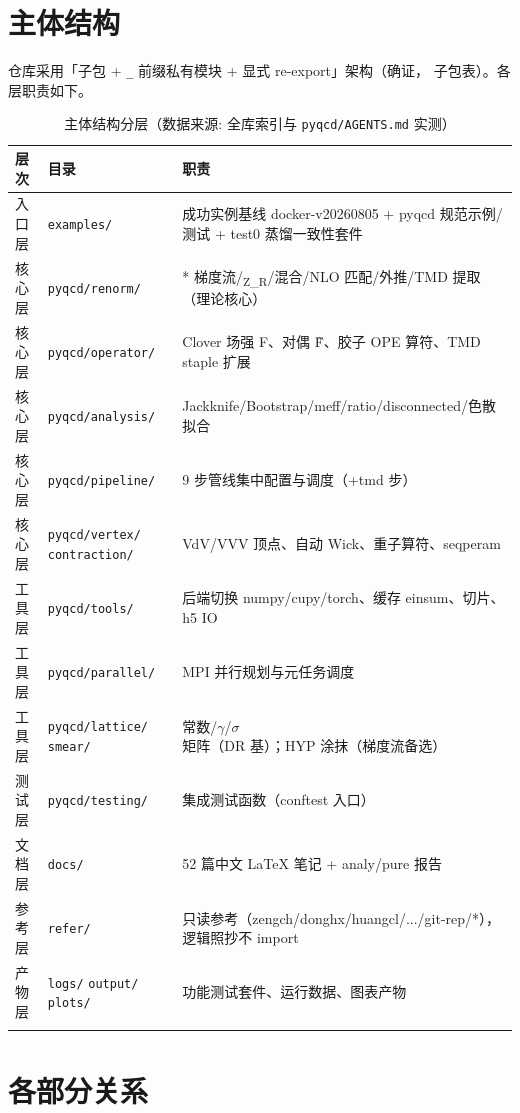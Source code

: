 \documentclass[UTF8]{ctexart}
\begin{document}
\section{主体结构}
仓库采用「子包 + \texttt{\_} 前缀私有模块 + 显式 re-export」架构（\textcolor{struct}{确证}，
\texttt{} 子包表）。各层职责如下。
\begin{xltabular}{\textwidth}{llX}
\toprule
\textcolor{struct}{层次} & 目录 & \textcolor{struct}{职责} \\
\midrule
\endhead
入口层 & \texttt{examples/} & 成功实例基线 docker-v20260805 + pyqcd 规范示例/测试 + test0 蒸馏一致性套件 \\
核心层 & \texttt{pyqcd/renorm/} & * 梯度流/\textsubscript{Z\_R}/混合/NLO 匹配/外推/TMD 提取（理论核心） \\
核心层 & \texttt{pyqcd/operator/} & Clover 场强 F、对偶 F̃、胶子 OPE 算符、TMD staple 扩展 \\
核心层 & \texttt{pyqcd/analysis/} & Jackknife/Bootstrap/meff/ratio/disconnected/色散拟合 \\
核心层 & \texttt{pyqcd/pipeline/} & 9 步管线集中配置与调度（+tmd 步） \\
核心层 & \texttt{pyqcd/vertex/} \texttt{contraction/} & VdV/VVV 顶点、自动 Wick、重子算符、seqperam \\
工具层 & \texttt{pyqcd/tools/} & 后端切换 numpy/cupy/torch、缓存 einsum、切片、h5 IO \\
工具层 & \texttt{pyqcd/parallel/} & MPI 并行规划与元任务调度 \\
工具层 & \texttt{pyqcd/lattice/} \texttt{smear/} & 常数/$\gamma$/$\sigma$ 矩阵（DR 基）；HYP 涂抹（梯度流备选） \\
测试层 & \texttt{pyqcd/testing/} & 集成测试函数（conftest 入口） \\
文档层 & \texttt{docs/} & 52 篇中文 LaTeX 笔记 + analy/pure 报告 \\
参考层 & \texttt{refer/} & 只读参考（zengch/donghx/huangcl/.../git-rep/*），逻辑照抄不 import \\
产物层 & \texttt{logs/} \texttt{output/} \texttt{plots/} & 功能测试套件、运行数据、图表产物 \\
\bottomrule
\caption{主体结构分层（数据来源: 全库索引与 \texttt{pyqcd/AGENTS.md} 实测）}
\end{xltabular}

\section{各部分关系}
\end{document}
